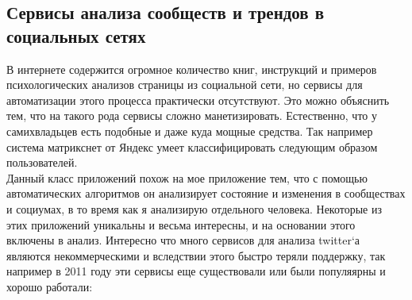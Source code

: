 \subsection{Сервисы анализа сообществ и трендов в социальных сетях}
В интернете содержится огромное количество книг, инструкций и примеров психологических анализов страницы из социальной сети, но сервисы для автоматизации этого процесса практически отсутствуют. Это можно объяснить тем, что на такого рода сервисы сложно манетизировать. Естественно, что у самихвладьцев есть подобные и даже куда мощные средства. Так например система матрикснет от Яндекс умеет классифицировать следующим образом пользователей.\\ %

Данный класс приложений похож на мое приложение тем, что с помощью автоматических алгоритмов  он анализирует состояние и изменения в сообществах и социумах, в то время как я анализирую отдельного человека. Некоторые из этих приложений уникальны и весьма интересны, и на основании этого включены в анализ. Интересно что много сервисов для анализа twitter`а являются некоммерческими и вследствии этого быстро теряли поддержку, так например в 2011 году эти сервисы еще существовали или были популяярны и хорошо работали:
